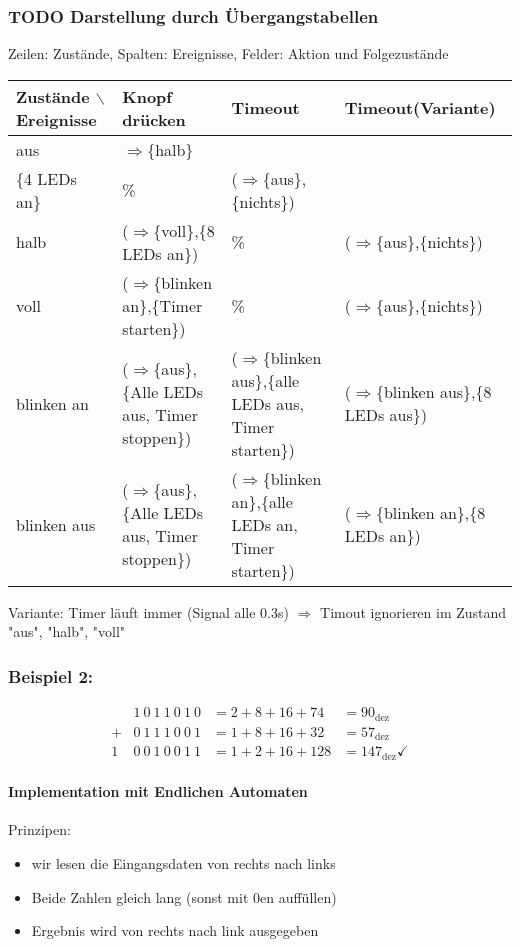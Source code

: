 \documentclass[a4paper]{scrartcl}
\begin{document}
\subsubsection{{\bfseries\sffamily TODO} Darstellung durch Übergangstabellen}
\label{sec-4-3-2}
Zeilen: Zustände, Spalten: Ereignisse, Felder: Aktion und Folgezustände
\begin{center}
\begin{tabular}{llll}
Zustände $\backslash$ Ereignisse & Knopf drücken & Timeout & Timeout(Variante)\\
\hline
aus & $\Rightarrow$\{halb\} \\ \{4 LEDs an\} & \% & ($\Rightarrow$\{aus\},\{nichts\})\\
halb & ($\Rightarrow$\{voll\},\{8 LEDs an\}) & \% & ($\Rightarrow$\{aus\},\{nichts\})\\
voll & ($\Rightarrow$\{blinken an\},\{Timer starten\}) & \% & ($\Rightarrow$\{aus\},\{nichts\})\\
blinken an & ($\Rightarrow$\{aus\},\{Alle LEDs aus, Timer stoppen\}) & ($\Rightarrow$\{blinken aus\},\{alle LEDs aus, Timer starten\}) & ($\Rightarrow$\{blinken aus\},\{8 LEDs aus\})\\
blinken aus & ($\Rightarrow$\{aus\},\{Alle LEDs aus, Timer stoppen\}) & ($\Rightarrow$\{blinken an\},\{alle LEDs an, Timer starten\}) & ($\Rightarrow$\{blinken an\},\{8 LEDs an\})\\
\end{tabular}
\end{center}

Variante: Timer läuft immer (Signal alle 0.3s) $\Rightarrow$ Timout ignorieren im Zustand "aus", "halb", "voll"
\subsubsection{Beispiel 2:}
\label{sec-4-3-3}
\begin{align}
&1~0~1~1~0~1~0 &= 2 + 8 + 16 + 74 &= 90_{\text{dez}} \\
+&0~1~1~1~0~0~1 &= 1 + 8 + 16 + 32 &= 57_{\text{dez}} \\
\hline
1~&0~0~1~0~0~1~1 &= 1 + 2 + 16 + 128 &= 147_{\text{dez}}\checkmark
\end{align}
\paragraph{Implementation mit Endlichen Automaten}
\label{sec-4-3-3-1}
Prinzipen:
\begin{itemize}
\item wir lesen die Eingangsdaten von rechts nach links
\item Beide Zahlen gleich lang (sonst mit 0en auffüllen)
\item Ergebnis wird von rechts nach link ausgegeben
\end{itemize}
\end{document}

